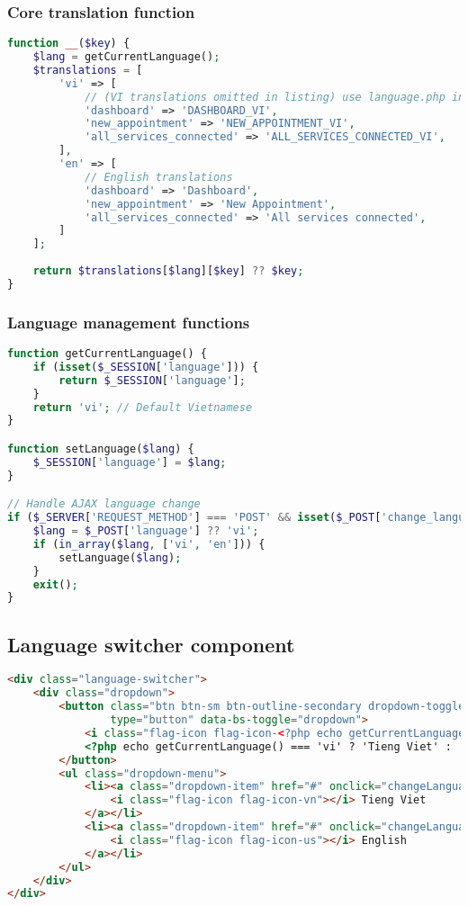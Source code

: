 \documentclass[12pt,a4paper]{report}
\begin{document}
\subsubsection{Core translation function}
\begin{lstlisting}[language=PHP, caption=Core translation function]
function __($key) {
    $lang = getCurrentLanguage();
    $translations = [
        'vi' => [
            // (VI translations omitted in listing) use language.php in repo
            'dashboard' => 'DASHBOARD_VI',
            'new_appointment' => 'NEW_APPOINTMENT_VI',
            'all_services_connected' => 'ALL_SERVICES_CONNECTED_VI',
        ],
        'en' => [
            // English translations
            'dashboard' => 'Dashboard',
            'new_appointment' => 'New Appointment',
            'all_services_connected' => 'All services connected',
        ]
    ];
    
    return $translations[$lang][$key] ?? $key;
}
\end{lstlisting}

\subsubsection{Language management functions}
\begin{lstlisting}[language=PHP, caption=Language management]
function getCurrentLanguage() {
    if (isset($_SESSION['language'])) {
        return $_SESSION['language'];
    }
    return 'vi'; // Default Vietnamese
}

function setLanguage($lang) {
    $_SESSION['language'] = $lang;
}

// Handle AJAX language change
if ($_SERVER['REQUEST_METHOD'] === 'POST' && isset($_POST['change_language'])) {
    $lang = $_POST['language'] ?? 'vi';
    if (in_array($lang, ['vi', 'en'])) {
        setLanguage($lang);
    }
    exit();
}
\end{lstlisting}

\subsection{Language switcher component}
\begin{lstlisting}[language=HTML, caption=Language switcher component]
<div class="language-switcher">
    <div class="dropdown">
        <button class="btn btn-sm btn-outline-secondary dropdown-toggle" 
                type="button" data-bs-toggle="dropdown">
            <i class="flag-icon flag-icon-<?php echo getCurrentLanguage() === 'vi' ? 'vn' : 'us'; ?>"></i>
            <?php echo getCurrentLanguage() === 'vi' ? 'Tieng Viet' : 'English'; ?>
        </button>
        <ul class="dropdown-menu">
            <li><a class="dropdown-item" href="#" onclick="changeLanguage('vi')">
                <i class="flag-icon flag-icon-vn"></i> Tieng Viet
            </a></li>
            <li><a class="dropdown-item" href="#" onclick="changeLanguage('en')">
                <i class="flag-icon flag-icon-us"></i> English  
            </a></li>
        </ul>
    </div>
</div>
\end{lstlisting}
\end{document}
